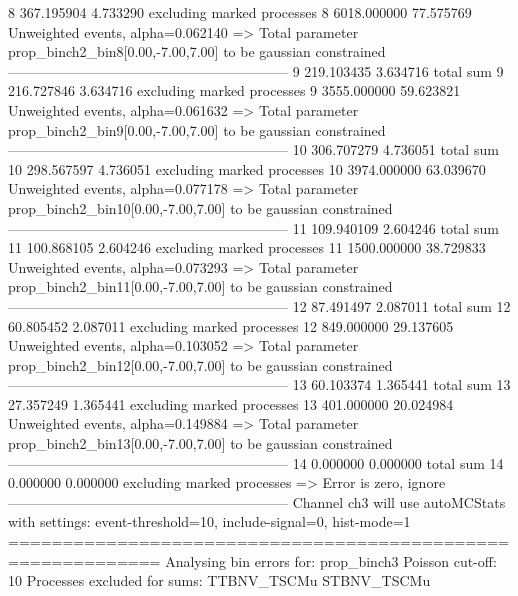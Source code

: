 8          367.195904      4.733290        excluding marked processes    
8          6018.000000     77.575769       Unweighted events, alpha=0.062140
  => Total parameter prop_binch2_bin8[0.00,-7.00,7.00] to be gaussian constrained
------------------------------------------------------------
9          219.103435      3.634716        total sum                     
9          216.727846      3.634716        excluding marked processes    
9          3555.000000     59.623821       Unweighted events, alpha=0.061632
  => Total parameter prop_binch2_bin9[0.00,-7.00,7.00] to be gaussian constrained
------------------------------------------------------------
10         306.707279      4.736051        total sum                     
10         298.567597      4.736051        excluding marked processes    
10         3974.000000     63.039670       Unweighted events, alpha=0.077178
  => Total parameter prop_binch2_bin10[0.00,-7.00,7.00] to be gaussian constrained
------------------------------------------------------------
11         109.940109      2.604246        total sum                     
11         100.868105      2.604246        excluding marked processes    
11         1500.000000     38.729833       Unweighted events, alpha=0.073293
  => Total parameter prop_binch2_bin11[0.00,-7.00,7.00] to be gaussian constrained
------------------------------------------------------------
12         87.491497       2.087011        total sum                     
12         60.805452       2.087011        excluding marked processes    
12         849.000000      29.137605       Unweighted events, alpha=0.103052
  => Total parameter prop_binch2_bin12[0.00,-7.00,7.00] to be gaussian constrained
------------------------------------------------------------
13         60.103374       1.365441        total sum                     
13         27.357249       1.365441        excluding marked processes    
13         401.000000      20.024984       Unweighted events, alpha=0.149884
  => Total parameter prop_binch2_bin13[0.00,-7.00,7.00] to be gaussian constrained
------------------------------------------------------------
14         0.000000        0.000000        total sum                     
14         0.000000        0.000000        excluding marked processes    
  => Error is zero, ignore      
------------------------------------------------------------
Channel ch3 will use autoMCStats with settings: event-threshold=10, include-signal=0, hist-mode=1
============================================================
Analysing bin errors for: prop_binch3
Poisson cut-off: 10
Processes excluded for sums: TTBNV_TSCMu STBNV_TSCMu
